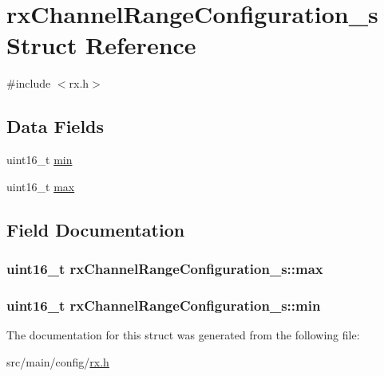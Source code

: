\hypertarget{structrxChannelRangeConfiguration__s}{\section{rx\+Channel\+Range\+Configuration\+\_\+s Struct Reference}
\label{structrxChannelRangeConfiguration__s}
}


{\ttfamily \#include $<$rx.\+h$>$}

\subsection*{Data Fields}
\begin{DoxyCompactItemize}
\item 
uint16\+\_\+t \hyperlink{structrxChannelRangeConfiguration__s_ae454ac8fdb9e431050cd22ae670119c3}{min}
\item 
uint16\+\_\+t \hyperlink{structrxChannelRangeConfiguration__s_a9c16b1cb60026cebf53afb6ff8437d66}{max}
\end{DoxyCompactItemize}


\subsection{Field Documentation}
\hypertarget{structrxChannelRangeConfiguration__s_a9c16b1cb60026cebf53afb6ff8437d66}{
\subsubsection[{max}]{\setlength{\rightskip}{0pt plus 5cm}uint16\+\_\+t rx\+Channel\+Range\+Configuration\+\_\+s\+::max}}\label{structrxChannelRangeConfiguration__s_a9c16b1cb60026cebf53afb6ff8437d66}
\hypertarget{structrxChannelRangeConfiguration__s_ae454ac8fdb9e431050cd22ae670119c3}{
\subsubsection[{min}]{\setlength{\rightskip}{0pt plus 5cm}uint16\+\_\+t rx\+Channel\+Range\+Configuration\+\_\+s\+::min}}\label{structrxChannelRangeConfiguration__s_ae454ac8fdb9e431050cd22ae670119c3}


The documentation for this struct was generated from the following file\+:\begin{DoxyCompactItemize}
\item 
src/main/config/\hyperlink{config_2rx_8h}{rx.\+h}\end{DoxyCompactItemize}
